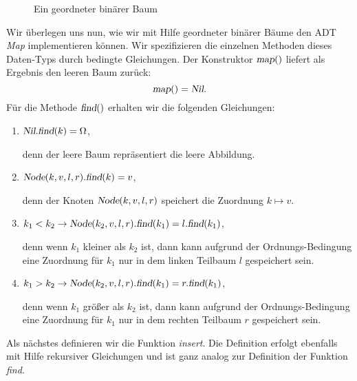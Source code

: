 \begin{figure}[!ht]
  \centering
  \caption{Ein geordneter bin\"arer Baum}
  \label{fig:graph1}
\end{figure}


Wir \"uberlegen uns nun, wie wir mit Hilfe geordneter bin\"arer B\"aume den ADT \textsl{Map}
implementieren k\"onnen.  Wir spezifizieren die einzelnen Methoden dieses Daten-Typs durch
bedingte Gleichungen.  Der Konstruktor $\textsl{map}()$ liefert als Ergebnis den leeren Baum zur\"uck:
\[ \textsl{map}() = \textsl{Nil}. \]
F\"ur die Methode $\textsl{find}()$ erhalten wir die folgenden Gleichungen:
\begin{enumerate}
\item $\textsl{Nil}.\textsl{find}(k) = \Omega$,

      denn der leere Baum repr\"asentiert die leere Abbildung.
\item $\textsl{Node}(k, v, l, r).\textsl{find}(k) = v$,

      denn der Knoten $\textsl{Node}(k,v,l,r)$ speichert die Zuordnung $k \mapsto v$.
\item $k_1 < k_2 \rightarrow \textsl{Node}(k_2, v, l, r).\textsl{find}(k_1) = l.\textsl{find}(k_1)$,

      denn wenn $k_1$ kleiner als $k_2$ ist, dann kann aufgrund der Ordnungs-Bedingung
      eine Zuordnung f\"ur $k_1$ nur in dem linken Teilbaum $l$ gespeichert sein.
\item $k_1 > k_2 \rightarrow \textsl{Node}(k_2, v, l, r).\textsl{find}(k_1) = r.\textsl{find}(k_1)$,

      denn wenn $k_1$ gr\"o{\ss}er als $k_2$ ist, dann kann aufgrund der Ordnungs-Bedingung
      eine Zuordnung f\"ur $k_1$ nur in dem rechten Teilbaum $r$ gespeichert sein.
\end{enumerate}
Als n\"achstes definieren wir die Funktion \textsl{insert}.  Die Definition erfolgt
ebenfalls mit Hilfe rekursiver Gleichungen und ist ganz analog zur Definition der 
Funktion \textsl{find}.
